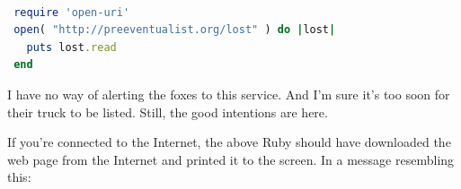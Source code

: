 \documentclass[10pt,twoside]{report}
\begin{document}
\begin{lstlisting}[basicstyle=\ttfamily\color{basiccolor},
    commentstyle = \ttfamily\color{commentcolor},
    keywordstyle=\ttfamily\color{keywordscolor},
    stringstyle=\color{stringcolor},
    language=Ruby,
    basicstyle=\small\ttfamily,
    showstringspaces=false,
  ]

 require 'open-uri'
 open( "http://preeventualist.org/lost" ) do |lost|
   puts lost.read
 end

\end{lstlisting}


I have no way of alerting the foxes to this service.  And I'm sure
it's too soon for their truck to be listed. Still, the good intentions
are here.

If you're connected to the Internet, the above Ruby should have
downloaded the web page from the Internet and printed it to the
screen.  In a message resembling this:
\end{document}

